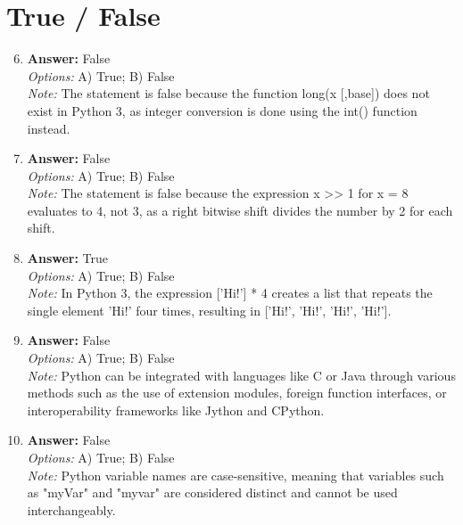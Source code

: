\documentclass[12pt]{article}
\begin{document}
\section*{True / False}
\begin{enumerate}[label=\arabic*.]
\setcounter{enumi}{5}
\item \textbf{Answer:} False
\\ \textit{Options:} A) True; B) False
\\ \textit{Note:} The statement is false because the function long(x [,base]) does not exist in Python 3, as integer conversion is done using the int() function instead.
\item \textbf{Answer:} False
\\ \textit{Options:} A) True; B) False
\\ \textit{Note:} The statement is false because the expression x \textgreater{}\textgreater{} 1 for x = 8 evaluates to 4, not 3, as a right bitwise shift divides the number by 2 for each shift.
\item \textbf{Answer:} True
\\ \textit{Options:} A) True; B) False
\\ \textit{Note:} In Python 3, the expression ['Hi!'] * 4 creates a list that repeats the single element 'Hi!' four times, resulting in ['Hi!', 'Hi!', 'Hi!', 'Hi!'].
\item \textbf{Answer:} False
\\ \textit{Options:} A) True; B) False
\\ \textit{Note:} Python can be integrated with languages like C or Java through various methods such as the use of extension modules, foreign function interfaces, or interoperability frameworks like Jython and CPython.
\item \textbf{Answer:} False
\\ \textit{Options:} A) True; B) False
\\ \textit{Note:} Python variable names are case-sensitive, meaning that variables such as "myVar" and "myvar" are considered distinct and cannot be used interchangeably.
\end{enumerate}
\end{document}
